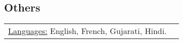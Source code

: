 \documentclass[margin]{res}
\begin{document}
\begin{resume}
\section{Others}
\begin{tabular}{l p{3in}}
  \underline{Languages:} English, French, Gujarati, Hindi. \\
\end{tabular}

\end{resume} 
\end{document}
